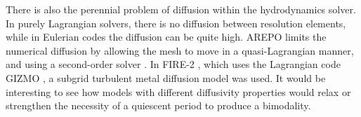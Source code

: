 There is also the perennial problem of diffusion within the hydrodynamics solver. In purely Lagrangian solvers, there is no diffusion between resolution elements, while in Eulerian codes the diffusion can be quite high. AREPO limits the numerical diffusion by allowing the mesh to move in a quasi-Lagrangian manner, and using a second-order solver \citep{2010MNRAS.401..791S}. In FIRE-2 \citep{2018MNRAS.480..800H}, which uses the Lagrangian code GIZMO \citep{2015MNRAS.450...53H}, a subgrid turbulent metal diffusion model was used. It would be interesting to see how models with different diffusivity properties would relax or strengthen the necessity of a quiescent period to produce a bimodality.

